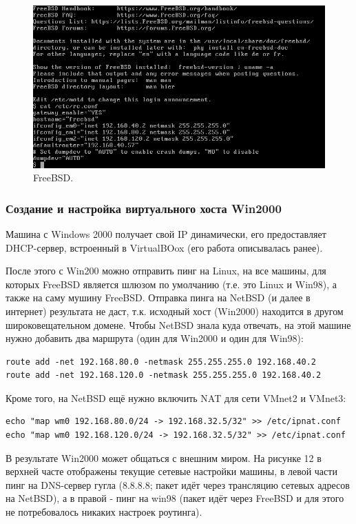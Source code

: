 \begin{figure}[h!]
\centering
\includegraphics[scale=0.9]{res/freebsd-general}
\caption{FreeBSD.}
\end{figure}

\subsubsection{Создание и настройка виртуального хоста Win2000}

Машина с Windows 2000 получает свой IP динамически, его предоставляет DHCP-сервер, встроенный в VirtualBOox (его работа описывалась ранее).

После этого с Win200 можно отправить пинг на Linux, на все машины, для которых FreeBSD является шлюзом по умолчанию (т.е. это Linux и Win98), а также на саму мушину FreeBSD. Отправка пинга на NetBSD (и далее в интернет) результата не даст, т.к. исходный хост (Win2000) находится в другом широковещательном домене. Чтобы NetBSD знала куда отвечать, на этой машине нужно добавить два маршрута (один для Win2000 и один для Win98):
\begin{Verbatim}[frame=single]
route add -net 192.168.80.0 -netmask 255.255.255.0 192.168.40.2
route add -net 192.168.120.0 -netmask 255.255.255.0 192.168.40.2
\end{Verbatim}

Кроме того, на NetBSD ещё нужно включить NAT для сети VMnet2 и VMnet3:
\begin{Verbatim}[frame=single]
echo "map wm0 192.168.80.0/24 -> 192.168.32.5/32" >> /etc/ipnat.conf
echo "map wm0 192.168.120.0/24 -> 192.168.32.5/32" >> /etc/ipnat.conf
\end{Verbatim}

В результате Win2000 может общаться с внешним миром. На рисунке 12 в верхней часте отображены текущие сетевые настройки машины, в левой части пинг на DNS-сервер гугла (8.8.8.8; пакет идёт через трансляцию сетевых адресов на NetBSD), а в правой - пинг на win98 (пакет идёт через FreeBSD и для этого не потребовалось никаких настроек роутинга).

